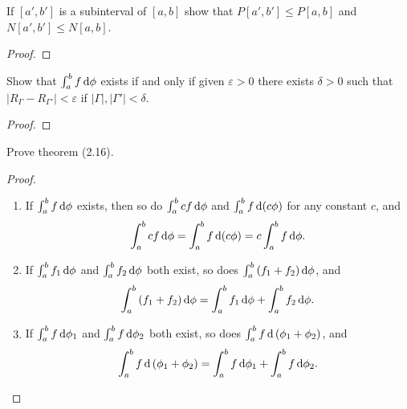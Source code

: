 \begin{problem}
If $[a',b']$ is a subinterval of $[a,b]$ show that $P[a',b']\leq P[a,b]$
and $N[a',b']\leq N[a,b]$.
\end{problem}
\begin{proof}
\end{proof}
\begin{problem}
Show that $\int_a^bf\mathop{}\!\mathrm{d}\phi$ exists if and only if given $\varepsilon>0$
there exists $\delta>0$ such that
$\left|R_\Gamma-R_{\Gamma'}\right|<\varepsilon$ if
$|\Gamma|,|\Gamma'|<\delta$.
\end{problem}
\begin{proof}
\end{proof}

\begin{problem}
Prove theorem (2.16).
\end{problem}
\begin{proof}
\begin{theorem*}
\begin{enumerate}[label=(\roman*)]
\item If $\int_a^b f\mathop{}\!\mathrm{d}\phi$ exists, then so do $\int_a^bcf\mathop{}\!\mathrm{d}\phi$ and
  $\int_a^b f\mathop{}\!\mathrm{d}(c\phi)$ for any constant $c$, and
\[
\int_a^bcf\mathop{}\!\mathrm{d}\phi=\int_a^bf\mathop{}\!\mathrm{d}(c\phi)=c\int_a^bf\mathop{}\!\mathrm{d}\phi.
\]
\item If $\int_a^b f_1\mathop{}\!\mathrm{d}\phi$ and $\int_a^bf_2\mathop{}\!\mathrm{d}\phi$ both exist, so
  does $\int_a^b\left(f_1+f_2\right)\mathop{}\!\mathrm{d}\phi$, and
\[
\int_a^b\left(f_1+f_2\right)\mathop{}\!\mathrm{d}\phi=\int_a^bf_1\mathop{}\!\mathrm{d}\phi+\int_a^bf_2\mathop{}\!\mathrm{d}\phi.
\]
\item If $\int_a^bf\mathop{}\!\mathrm{d}\phi_1$ and $\int_a^bf\mathop{}\!\mathrm{d}\phi_2$ both exist, so
  does $\int_a^bf\mathop{}\!\mathrm{d}\left(\phi_1+\phi_2\right)$, and
\[
\int_a^bf\mathop{}\!\mathrm{d}\left(\phi_1+\phi_2\right)=\int_a^bf\mathop{}\!\mathrm{d}\phi_1+\int_a^bf\mathop{}\!\mathrm{d}\phi_2.
\]
\end{enumerate}
\end{theorem*}
\end{proof}

